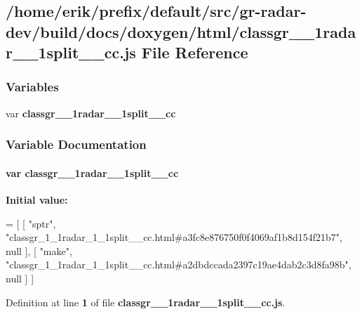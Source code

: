 \subsection{/home/erik/prefix/default/src/gr-\/radar-\/dev/build/docs/doxygen/html/classgr\+\_\+\_\+1radar\+\_\+\_\+1split\+\_\+\+\_\+cc.js File Reference}
\label{classgr__1__1radar__1__1split____cc_8js}
\subsubsection*{Variables}
\begin{DoxyCompactItemize}
\item 
var {\bf classgr\+\_\+\_\+1radar\+\_\+\_\+1split\+\_\+\+\_\+cc}
\end{DoxyCompactItemize}


\subsubsection{Variable Documentation}
\paragraph[{classgr\+\_\+1\+\_\+1radar\+\_\+1\+\_\+1split\+\_\+\+\_\+cc}]{\setlength{\rightskip}{0pt plus 5cm}var classgr\+\_\+\_\+1radar\+\_\+\_\+1split\+\_\+\+\_\+cc}\label{classgr__1__1radar__1__1split____cc_8js_a0be519c750989591afb7133fbf472e13}
{\bfseries Initial value\+:}
\begin{DoxyCode}
=
[
    [ \textcolor{stringliteral}{"sptr"}, \textcolor{stringliteral}{"classgr\_1\_1radar\_1\_1split\_\_cc.html#a3fc8e876750f0f4069af1b8d154f21b7"}, null ],
    [ \textcolor{stringliteral}{"make"}, \textcolor{stringliteral}{"classgr\_1\_1radar\_1\_1split\_\_cc.html#a2dbdccada2397c19ae4dab2c3d8fa98b"}, null ]
]
\end{DoxyCode}


Definition at line {\bf 1} of file {\bf classgr\+\_\+\_\+1radar\+\_\+\_\+1split\+\_\+\+\_\+cc.\+js}.

